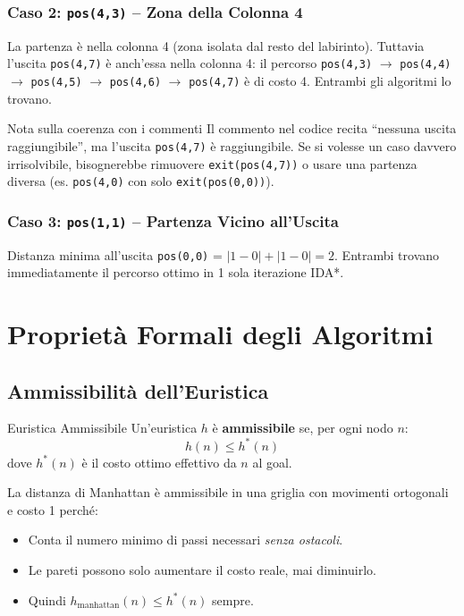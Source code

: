\documentclass[12pt,a4paper]{article}
\begin{document}
\subsubsection{Caso 2: \texttt{pos(4,3)} -- Zona della Colonna 4}

La partenza è nella colonna 4 (zona isolata dal resto del labirinto). Tuttavia
l'uscita \texttt{pos(4,7)} è anch'essa nella colonna 4: il percorso
\texttt{pos(4,3)} $\to$ \texttt{pos(4,4)} $\to$ \texttt{pos(4,5)} $\to$
\texttt{pos(4,6)} $\to$ \texttt{pos(4,7)} è di costo 4. Entrambi gli algoritmi
lo trovano.

\begin{warnbox}{Nota sulla coerenza con i commenti}
Il commento nel codice recita ``nessuna uscita raggiungibile'', ma l'uscita
\texttt{pos(4,7)} è raggiungibile. Se si volesse un caso davvero irrisolvibile,
bisognerebbe rimuovere \texttt{exit(pos(4,7))} o usare una partenza diversa
(es. \texttt{pos(4,0)} con solo \texttt{exit(pos(0,0))}).
\end{warnbox}

\subsubsection{Caso 3: \texttt{pos(1,1)} -- Partenza Vicino all'Uscita}

Distanza minima all'uscita \texttt{pos(0,0)} = $|1-0|+|1-0| = 2$.
Entrambi trovano immediatamente il percorso ottimo in 1 sola iterazione IDA*.

\section{Proprietà Formali degli Algoritmi}

\subsection{Ammissibilità dell'Euristica}

\begin{defbox}{Euristica Ammissibile}
Un'euristica $h$ è \textbf{ammissibile} se, per ogni nodo $n$:
\[h(n) \le h^*(n)\]
dove $h^*(n)$ è il costo ottimo effettivo da $n$ al goal.
\end{defbox}

La distanza di Manhattan è ammissibile in una griglia con movimenti ortogonali
e costo 1 perché:
\begin{itemize}[noitemsep]
  \item Conta il numero minimo di passi necessari \emph{senza ostacoli}.
  \item Le pareti possono solo aumentare il costo reale, mai diminuirlo.
  \item Quindi $h_{\text{manhattan}}(n) \le h^*(n)$ sempre.
\end{itemize}
\end{document}
